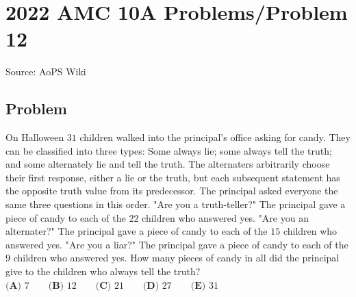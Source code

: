\documentclass[12pt]{article}
\begin{document}
\section*{{2022 AMC 10A Problems/Problem 12}}
Source: AoPS Wiki

\subsection*{Problem}
On Halloween $31$ children walked into the principal's office asking for candy. They
can be classified into three types: Some always lie; some always tell the truth; and
some alternately lie and tell the truth. The alternaters arbitrarily choose their first
response, either a lie or the truth, but each subsequent statement has the opposite
truth value from its predecessor. The principal asked everyone the same three
questions in this order. "Are you a truth-teller?" The principal gave a piece of candy to each of the $22$ children who answered yes. "Are you an alternater?" The principal gave a piece of candy to each of the $15$ children who answered yes. "Are you a liar?" The principal gave a piece of candy to each of the $9$ children who
answered yes. How many pieces of candy in all did the principal give to the children who always
tell the truth? $\textbf{(A) } 7 \qquad \textbf{(B) } 12 \qquad \textbf{(C) } 21 \qquad \textbf{(D) } 27 \qquad \textbf{(E) } 31$
\end{document}

